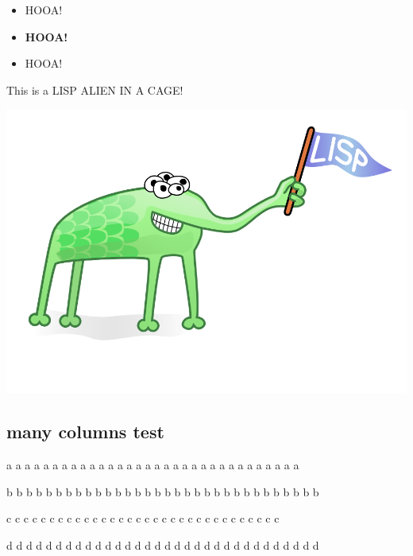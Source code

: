 \begin{container-fluid}
\begin{row-fluid}
\begin{span6}
\begin{itemize}
\item HOOA!
\item \textbf{HOOA!}
\item HOOA!
\end{itemize}
\end{span6}
\begin{span6}
This is a LISP ALIEN IN A CAGE!

\includegraphics[width=.9\linewidth]{img/alien.png}
\end{span6}
\end{row-fluid}
\end{container-fluid}


\subsection{many columns test}
\label{sec-12-2}


\begin{container-fluid}
\begin{row-fluid}
\begin{span3}
a a a a a a a a a a a a a a a a a a a a a a a a a a a a a a a a
\end{span3}
\begin{span3}
b b b b b b b b b b b b b b b b b b b b b b b b b b b b b b b b
\end{span3}
\begin{span3}
c c c c c c c c c c c c c c c c c c c c c c c c c c c c c c c c
\end{span3}
\begin{span3}
d d d d d d d d d d d d d d d d d d d d d d d d d d d d d d d d
\end{span3}
\end{row-fluid}
\end{container-fluid}


